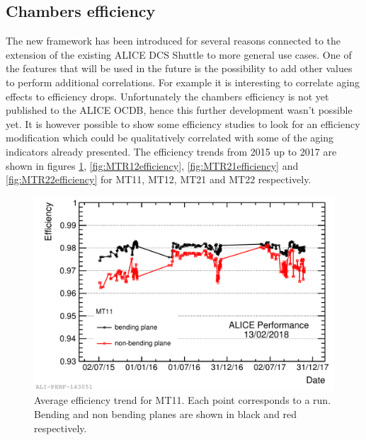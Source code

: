 \subsection{Chambers efficiency}
The new framework has been introduced for several reasons connected to the extension of the existing ALICE DCS Shuttle to more general use cases.
One of the features that will be used in the future is the possibility to add other values to perform additional correlations.
For example it is interesting to correlate aging effects to efficiency drops.
Unfortunately the chambers efficiency is not yet published to the ALICE OCDB, hence this further development wasn't possible yet.
It is however possible to show some efficiency studies to look for an efficiency modification which could be qualitatively correlated with some of the aging indicators already presented.
The efficiency trends from 2015 up to 2017 are shown in figures \ref{fig:MTR11efficiency}, \ref{fig:MTR12efficiency}, \ref{fig:MTR21efficiency} and \ref{fig:MTR22efficiency} for MT11, MT12, MT21 and MT22 respectively.

\begin{figure}[!ht]
\begin{center}
\includegraphics[width=0.8\linewidth]{Chapters/Performance/Figs/2018-Feb-16-effTrend_2015-2017_Ch11.pdf}
\caption{Average efficiency trend for MT11. Each point corresponds to a run. Bending and non bending planes are shown in black and red respectively.}
\label{fig:MTR11efficiency}
\end{center}
\end{figure}

